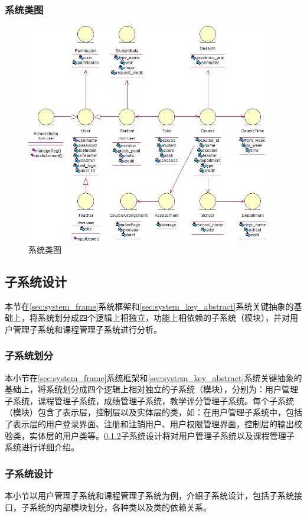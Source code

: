 \subsubsection{系统类图}
\begin{figure}[htbp]
  \centering
  \includegraphics[width=0.95\textwidth]{img/system_class}
  \caption{系统类图}
\end{figure}

\subsection{子系统设计}
本节在\ref{sec:system_frame}系统框架和\ref{sec:system_key_abstract}系统关键抽象的基础上，将系统划分成四个逻辑上相独立，功能上相依赖的子系统（模块），并对用户管理子系统和课程管理子系统进行分析。
\subsubsection{子系统划分}\label{sec:subsystem_div}
本小节在\ref{sec:system_frame}系统框架和\ref{sec:system_key_abstract}系统关键抽象的基础上，将系统划分成四个逻辑上相对独立的子系统（模块），分别为：用户管理子系统，课程管理子系统，成绩管理子系统，教学评分管理子系统。每个子系统（模块）包含了表示层，控制层以及实体层的类，如：在用户管理子系统中，包括了表示层的用户登录界面、注册和注销用户、用户权限管理界面，控制层的输出校验类，实体层的用户类等。\ref{sec:subsystem_design}子系统设计将对用户管理子系统以及课程管理子系统进行详细介绍。
\subsubsection{子系统设计}\label{sec:subsystem_design}
本小节以用户管理子系统和课程管理子系统为例，介绍子系统设计，包括子系统接口，子系统的内部模块划分，各种类以及类的依赖关系。

